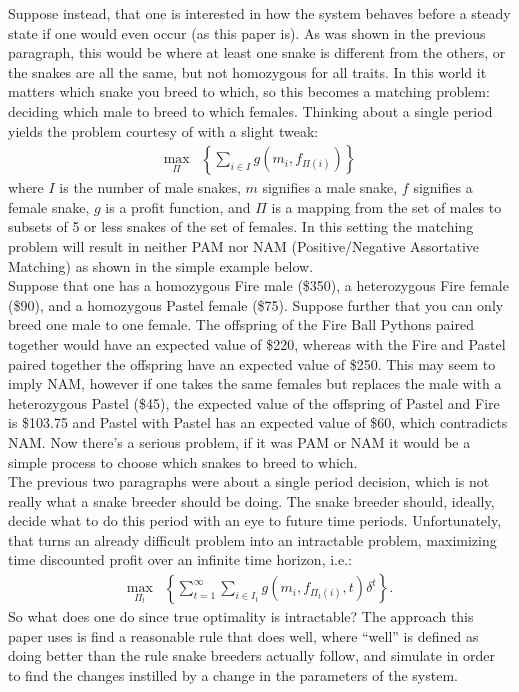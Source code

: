 \documentclass{article}
\begin{document}
	\indent Suppose instead, that one is interested in how the system behaves before a steady state if one would even occur (as this paper is). As was shown in the previous paragraph, this would be where at least one snake is different from the others, or the snakes are all the same, but not homozygous for all traits. In this world it matters which snake you breed to which, so this becomes a matching  problem: deciding which male to breed to which females. Thinking about a single period yields the problem courtesy of \cite{becker} with a slight tweak:
	\begin{align*}
		\max_{\Pi}&\left\{ \sum_{i\in I}g\left(m_i,f_{\Pi(i)}\right) \right\}
	\end{align*}
	where $I$ is the number of male snakes, $m$ signifies a male snake, $f$ signifies a female snake, $g$ is a profit function, and $\Pi$ is a mapping from the set of males to subsets of 5 or less snakes of the set of females. In this setting the matching problem will result in neither PAM nor NAM (Positive/Negative Assortative Matching) as shown in the simple example below.\\
	\indent Suppose that one has a homozygous Fire male (\$350), a heterozygous Fire female (\$90), and a homozygous Pastel female (\$75). Suppose further that you can only breed one male to one female. The offspring of the Fire Ball Pythons paired together would have an expected value of \$220, whereas with the Fire and Pastel paired together the offspring have an expected value of \$250. This may seem to imply NAM, however if one takes the same females but replaces the male with a heterozygous Pastel (\$45), the expected value of the offspring of Pastel and Fire is \$103.75 and Pastel with Pastel has an expected value of \$60, which contradicts NAM. Now there's a serious problem, if it was PAM or NAM it would be a simple process to choose which snakes to breed to which.\\
	\indent The previous two paragraphs were about a single period decision, which is not really what a snake breeder should be doing. The snake breeder should, ideally, decide what to do this period with an eye to future time periods. Unfortunately, that turns an already difficult problem into an intractable problem, maximizing time discounted profit over an infinite time horizon, i.e.:
	\begin{align*}
		\max_{\Pi_t}&\left\{ \sum_{t=1}^{\infty}\sum_{i\in I_t}g\left(m_i,f_{\Pi_t(i)},t\right)\delta^t \right\}.
	\end{align*}
	\indent So what does one do since true optimality is intractable? The approach this paper uses is find a reasonable rule that does well, where ``well'' is defined as doing better than the rule snake breeders actually follow, and simulate in order to find the changes instilled by a change in the parameters of the system.
\end{document}
